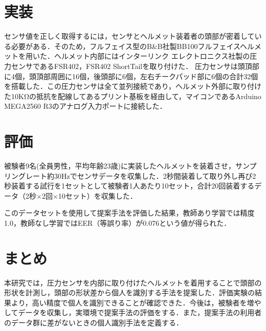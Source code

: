 \documentclass[Japanese,noauthor]{dicomopapers}
\begin{document}
\section{実装}
センサ値を正しく取得するには，センサとヘルメット装着者の頭部が密着している必要がある．そのため，フルフェイス型のB\&B社製BB100フルフェイスヘルメットを用いた．ヘルメット内部にはインターリンク エレクトロニクス社製の圧力センサであるFSR402，FSR402 ShortTailを取り付けた．%
圧力センサは頭頂部に4個，頭頂部周囲に16個，後頭部に6個，左右チークパッド部に6個の合計32個を搭載した．この圧力センサは全て並列接続であり，ヘルメット外部に取り付けた10KΩの抵抗を配線してあるプリント基板を経由して，マイコンであるArduino MEGA2560 R3のアナログ入力ポートに接続した．


\section{評価}
被験者9名(全員男性，平均年齢23歳)に実装したヘルメットを装着させ，サンプリングレート約30Hzでセンサデータを収集した．2秒間装着して取り外し再び2秒装着する試行を1セットとして被験者1人あたり10セット，合計20回装着するデータ（2秒$\times$2回$\times$10セット）を収集した．\par
このデータセットを使用して提案手法を評価した結果，教師あり学習では精度1.0，教師なし学習ではEER（等誤り率）が0.076という値が得られた．

\section{まとめ}
本研究では，圧力センサを内部に取り付けたヘルメットを着用することで頭部の形状を計測し，頭部の形状差から個人を識別する手法を提案した．評価実験の結果より，高い精度で個人を識別できることが確認できた．今後は，被験者を増やしてデータを収集し，実環境で提案手法の評価をする．また，提案手法の利用者のデータ群に差がないときの個人識別手法を定義する．




\end{document}
